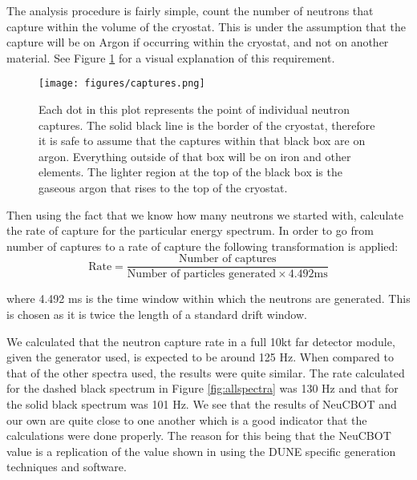 The analysis procedure is fairly simple, count the number of neutrons that capture within the volume of the cryostat.
This is under the assumption that the capture will be on Argon if occurring within the cryostat, and not on another material.
See Figure \ref{fig:captures} for a visual explanation of this requirement.

\begin{figure}[h] %
   \centering
   \texttt{[image: figures/captures.png]} 
   \caption{Each dot in this plot represents the point of individual neutron captures. The solid black line is the border of the cryostat, therefore it is safe to assume that the captures within that black box are on argon. Everything outside of that box will be on iron and other elements. The lighter region at the top of the black box is the gaseous argon that rises to the top of the cryostat.}
   \label{fig:captures}
\end{figure}

Then using the fact that we know how many neutrons we started with, calculate the rate of capture for the particular energy spectrum.
In order to go from number of captures to a rate of capture the following transformation is applied:
\begin{equation}
\textrm{Rate} = \frac{\textrm{Number of captures}}{\textrm{Number of particles generated} \times 4.492 \textrm{ms}}
\end{equation}

\noindent where 4.492 ms is the time window within which the neutrons are generated. 
This is chosen as it is twice the length of a standard drift window.

We calculated that the neutron capture rate in a full 10kt far detector module, given the generator used, is expected to be around 125 Hz.
When compared to that of the other spectra used, the results were quite similar. 
The rate calculated for the dashed black spectrum in Figure \ref{fig:allspectra} was 130 Hz and that for the solid black spectrum was 101 Hz.
We see that the results of NeuCBOT and our own are quite close to one another which is a good indicator that the calculations were done properly. 
The reason for this being that the NeuCBOT value is a replication of the value shown in \cite{capozzi2018dune} using the DUNE specific generation techniques and software.


